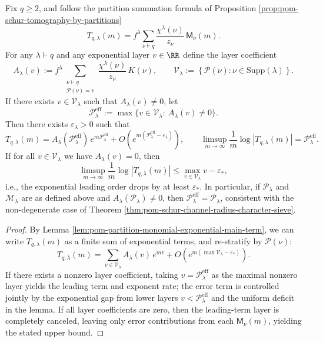 \begin{theorem}\label{thm:pom-schur-trace-finite-laplace-principle}
Fix \(q\ge 2\), and follow the partition summation formula of Proposition \ref{prop:pom-schur-tomography-by-partitions}
\[
T_{q,\lambda}(m)=f^\lambda\sum_{\nu\vdash q}\frac{\chi^\lambda(\nu)}{z_\nu}\,\mathsf{M}_\nu(m).
\]
For any \(\lambda\vdash q\) and any exponential layer \(v\in\RR\) define the layer coefficient
\[
A_\lambda(v):=
f^\lambda\!\!\sum_{\substack{\nu\vdash q\\ \mathcal{P}(\nu)=v}}\frac{\chi^\lambda(\nu)}{z_\nu}\,K(\nu),
\qquad
\mathcal{V}_\lambda:=\left\{\mathcal{P}(\nu):\nu\in\mathrm{Supp}(\lambda)\right\}.
\]
If there exists \(v\in\mathcal{V}_\lambda\) such that \(A_\lambda(v)\neq 0\), let
\[
\mathcal{P}_\lambda^{\mathrm{eff}}
:=
\max\{v\in\mathcal{V}_\lambda:\ A_\lambda(v)\neq 0\}.
\]
Then there exists \(\varepsilon_\lambda>0\) such that
\[
T_{q,\lambda}(m)
=
A_\lambda(\mathcal{P}_\lambda^{\mathrm{eff}})\,e^{m\mathcal{P}_\lambda^{\mathrm{eff}}}
+O\!\left(e^{m(\mathcal{P}_\lambda^{\mathrm{eff}}-\varepsilon_\lambda)}\right),
\qquad
\limsup_{m\to\infty}\frac{1}{m}\log|T_{q,\lambda}(m)|=\mathcal{P}_\lambda^{\mathrm{eff}}.
\]
If for all \(v\in\mathcal{V}_\lambda\) we have \(A_\lambda(v)=0\), then
\[
\limsup_{m\to\infty}\frac{1}{m}\log|T_{q,\lambda}(m)|
\le
\max_{v\in\mathcal{V}_\lambda}v-\varepsilon_*,
\]
i.e., the exponential leading order drops by at least \(\varepsilon_*\).
In particular, if \(\mathcal{P}_\lambda\) and \(\mathcal{M}_\lambda\) are as defined above and \(A_\lambda(\mathcal{P}_\lambda)\neq 0\), then \(\mathcal{P}_\lambda^{\mathrm{eff}}=\mathcal{P}_\lambda\), consistent with the non-degenerate case of Theorem \ref{thm:pom-schur-channel-radius-character-sieve}.
\end{theorem}
\begin{proof}
By Lemma \ref{lem:pom-partition-monomial-exponential-main-term}, we can write \(T_{q,\lambda}(m)\) as a finite sum of exponential terms, and re-stratify by \(\mathcal{P}(\nu)\):
\[
T_{q,\lambda}(m)=\sum_{v\in\mathcal{V}_\lambda} A_\lambda(v)\,e^{mv}+O\!\left(e^{m(\max\mathcal{V}_\lambda-\varepsilon_*)}\right).
\]
If there exists a nonzero layer coefficient, taking \(v=\mathcal{P}_\lambda^{\mathrm{eff}}\) as the maximal nonzero layer yields the leading term and exponent rate;
the error term is controlled jointly by the exponential gap from lower layers \(v<\mathcal{P}_\lambda^{\mathrm{eff}}\) and the uniform deficit in the lemma.
If all layer coefficients are zero, then the leading-term layer is completely canceled, leaving only error contributions from each \(\mathsf{M}_\nu(m)\), yielding the stated upper bound.
\end{proof}

